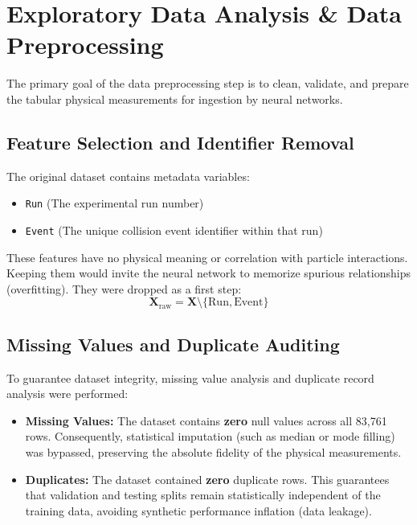 \documentclass[11pt,a4paper]{article}
\begin{document}
\section{Exploratory Data Analysis \& Data Preprocessing}

The primary goal of the data preprocessing step is to clean, validate, and prepare the tabular physical measurements for ingestion by neural networks.

\subsection{Feature Selection and Identifier Removal}

The original dataset contains metadata variables:
\begin{itemize}
    \item \texttt{Run} (The experimental run number)
    \item \texttt{Event} (The unique collision event identifier within that run)
\end{itemize}

These features have no physical meaning or correlation with particle interactions. Keeping them would invite the neural network to memorize spurious relationships (overfitting). They were dropped as a first step:
\begin{equation}
\mathbf{X}_{\text{raw}} = \mathbf{X} \setminus \{\text{Run}, \text{Event}\}
\end{equation}

\subsection{Missing Values and Duplicate Auditing}

To guarantee dataset integrity, missing value analysis and duplicate record analysis were performed:
\begin{itemize}
    \item \textbf{Missing Values:} The dataset contains \textbf{zero} null values across all 83,761 rows. Consequently, statistical imputation (such as median or mode filling) was bypassed, preserving the absolute fidelity of the physical measurements.
    \item \textbf{Duplicates:} The dataset contained \textbf{zero} duplicate rows. This guarantees that validation and testing splits remain statistically independent of the training data, avoiding synthetic performance inflation (data leakage).
\end{itemize}
\end{document}
